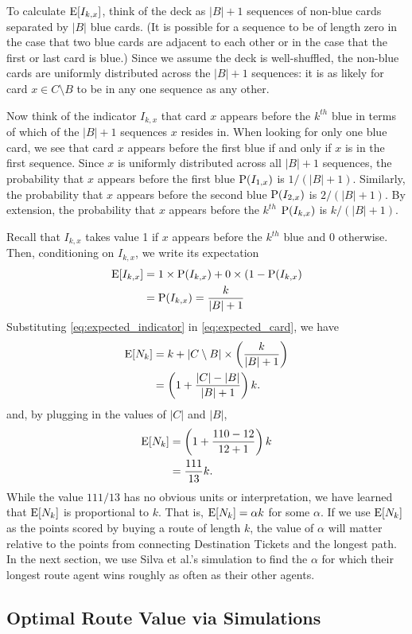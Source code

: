 To calculate $\operatorname{\mathrm{E}}[I_{k,x}]$, think of the deck as $|B| + 1$ sequences 
of non-blue cards separated by $|B|$ blue cards.
(It is possible for a sequence to be of length zero
in the case that two blue cards are adjacent to each other or
in the case that the first or last card is blue.)
Since we assume the deck is well-shuffled, the non-blue cards
are uniformly distributed across the $|B| + 1$ sequences:
it is as likely for card $x \in C \setminus B$ to be in any one sequence
as any other.

Now think of the indicator $I_{k,x}$ that card $x$ appears
before the $k^{th}$ blue in terms of which of the $|B| + 1$
sequences $x$ resides in.
When looking for only one blue card,
we see that card $x$ appears before the first blue if and only if
$x$ is in the first sequence.
Since $x$ is uniformly distributed across all $|B| + 1$ sequences,
the probability that $x$ appears before the first blue $\operatorname{\mathrm{P}}(I_{1,x})$
is $1/(|B| + 1)$.
Similarly, the probability that $x$ appears before the second blue
$\operatorname{\mathrm{P}}(I_{2,x})$ is $2/(|B| + 1)$.
By extension, the probability that $x$ appears before the $k^{th}$
$\operatorname{\mathrm{P}}(I_{k,x})$ is $k/(|B| + 1)$.

Recall that $I_{k,x}$ takes value 1 if $x$ appears before the 
$k^{th}$ blue and 0 otherwise.
Then, conditioning on $I_{k,x}$, we write its expectation
\begin{align} \label{eq:expected_indicator}
    \operatorname{\mathrm{E}}[I_{k,x}] &= 1 \times \operatorname{\mathrm{P}}(I_{k,x})
    + 0 \times (1-\operatorname{\mathrm{P}}(I_{k,x}) \nonumber \\
    &=\operatorname{\mathrm{P}}(I_{k,x}) = \frac{k}{|B| + 1}
\end{align}
Substituting \cref{eq:expected_indicator} in \cref{eq:expected_card},
we have
\begin{align}
    \operatorname{\mathrm{E}}[N_k] &= k + |C \setminus B| \times \left(\frac{k}{|B| + 1}\right)
    \nonumber \\
    &= \left(1 + \frac{|C| - |B|}{|B| + 1} \right)k. \nonumber
\end{align}
and, by plugging in the values of $|C|$ and $|B|$,
\begin{align}
    \operatorname{\mathrm{E}}[N_k] &= \left(1 + \frac{110 - 12}{12 + 1} \right)k \nonumber \\
    &= \frac{111}{13}k. \nonumber
\end{align}
While the value $111/13$ has no obvious units or interpretation,
we have learned that $\operatorname{\mathrm{E}}[N_k]$ is proportional to $k$.
That is, $\operatorname{\mathrm{E}}[N_k] = \alpha k$ for some $\alpha$.
If we use $\operatorname{\mathrm{E}}[N_k]$ as the points scored by buying a route of length
$k$, the value of $\alpha$ will matter relative to the points from
connecting Destination Tickets and the longest path.
In the next section, we use Silva et al.'s simulation
to find the $\alpha$ for which their longest route
agent wins roughly as often as their other agents.

\subsection{Optimal Route Value via Simulations}
